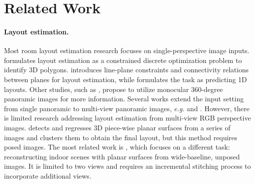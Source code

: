 \section{Related Work}

\paragraph{Layout estimation.}
Most room layout estimation research focuses on single-perspective image inputs. \cite{stekovic2020general} formulates layout estimation as a constrained discrete optimization problem to identify 3D polygons. \cite{yang2022learning} introduces line-plane constraints and connectivity relations between planes for layout estimation, while \cite{sun2019horizonnet} formulates the task as predicting 1D layouts.  
Other studies, such as \cite{zou2018layoutnet}, propose to utilize monocular 360-degree panoramic images for more information.
Several works extend the input setting from single panoramic to multi-view panoramic images, \textit{e.g.} \cite{wang2022psmnet} and \cite{hu2022mvlayoutnet}.
However, there is limited research addressing layout estimation from multi-view RGB perspective images. \cite{howard2019thinking} detects and regresses 3D piece-wise planar surfaces from a series of images and clusters them to obtain the final layout, but this method requires posed images. The most related work is \cite{jin2021planar}, which focuses on a different task: reconstructing indoor scenes with planar surfaces from wide-baseline, unposed images. It is limited to two views and requires an incremental stitching process to incorporate additional views.

